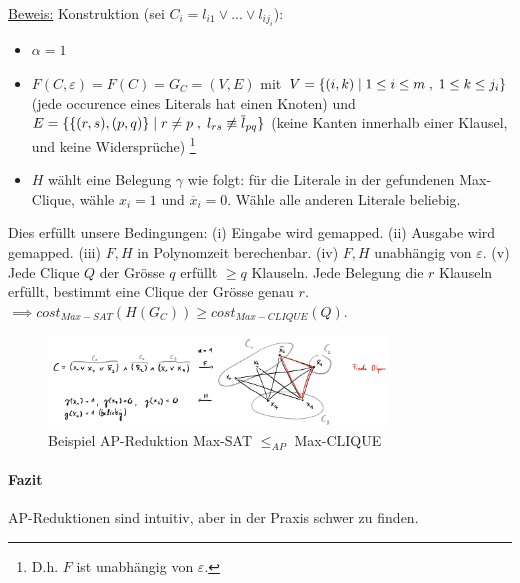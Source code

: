 \underline{Beweis:} Konstruktion (sei $C_i = l_{i1} \vee ... \vee l_{ij_i}$):
\begin{itemize}
    \item $\alpha = 1$
    \item $ F(C, \varepsilon) = F(C) = G_C = (V,E) $ mit
        $ V = \{ (i, k) \; | \; 1 \leq i \leq m \; , \; 1 \leq k \leq j_i \}$
        (jede occurence eines Literals hat einen Knoten) und
        $ E = \{ \{ (r,s) , (p,q) \} \; | \; r \neq p \; , \; l_{rs} \not \equiv \overline{l}_{pq} \} $
        (keine Kanten innerhalb einer Klausel, und keine Widersprüche)
        \footnote{D.h. $F$ ist unabhängig von $\varepsilon$.}
    \item $ H $ wählt eine Belegung $\gamma$ wie folgt:
        für die Literale in der gefundenen Max-Clique, wähle $x_i=1$ und $\overline{x}_i=0$.
        Wähle alle anderen Literale beliebig.
\end{itemize}
Dies erfüllt unsere Bedingungen:
(i) Eingabe wird gemapped. (ii) Ausgabe wird gemapped.
(iii) $F, H$ in Polynomzeit berechenbar. (iv) $F, H$ unabhängig von $\varepsilon$.
(v) Jede Clique $Q$ der Grösse $q$ erfüllt $\geq q$ Klauseln.
Jede Belegung die $r$ Klauseln erfüllt, bestimmt eine Clique der Grösse genau $r$.
\\
$\implies cost_{Max-SAT}(H(G_C)) \geq cost_{Max-CLIQUE}(Q)$.

\begin{figure}[h]
    \centering
    \includegraphics[width=0.8\textwidth]{images/ap-reduktion-beispiel.png}
    \caption{Beispiel AP-Reduktion Max-SAT $\leq_{AP}$ Max-CLIQUE}
\end{figure}

\paragraph{Fazit}
AP-Reduktionen sind intuitiv, aber in der Praxis schwer zu finden.
